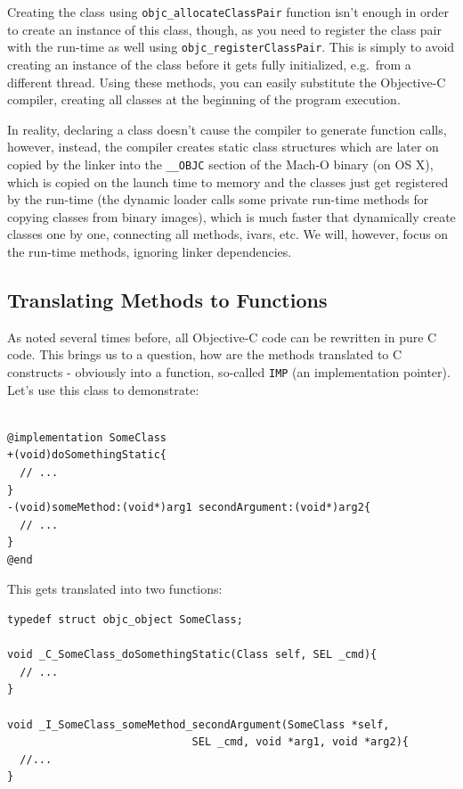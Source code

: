Creating the class using \verb=objc_allocateClassPair= function isn't enough in order to create an instance of this class, though, as you need to register the class pair with the run-time as well using \verb=objc_registerClassPair=. This is simply to avoid creating an instance of the class before it gets fully initialized, e.g.\ from a different thread. Using these methods, you can easily substitute the Objective-C compiler, creating all classes at the beginning of the program execution.

In reality, declaring a class doesn't cause the compiler to generate function calls, however, instead, the compiler creates static class structures which are later on copied by the linker into the \verb=__OBJC= section of the Mach-O binary (on OS X), which is copied on the launch time to memory and the classes just get registered by the run-time (the dynamic loader calls some private run-time methods for copying classes from binary images), which is much faster that dynamically create classes one by one, connecting all methods, ivars, etc. We will, however, focus on the run-time methods, ignoring linker dependencies.

\subsection{Translating Methods to Functions}

As noted several times before, all Objective-C code can be rewritten in pure C code. This brings us to a question, how are the methods translated to C constructs - obviously into a function, so-called \verb=IMP= (an implementation pointer). Let's use this class to demonstrate:

\begin{verbatim}

@implementation SomeClass
+(void)doSomethingStatic{
  // ...
}
-(void)someMethod:(void*)arg1 secondArgument:(void*)arg2{
  // ...
}
@end

\end{verbatim}

This gets translated into two functions:

\begin{verbatim}
typedef struct objc_object SomeClass;

void _C_SomeClass_doSomethingStatic(Class self, SEL _cmd){
  // ...
}

void _I_SomeClass_someMethod_secondArgument(SomeClass *self,
                             SEL _cmd, void *arg1, void *arg2){
  //...
}
\end{verbatim}

